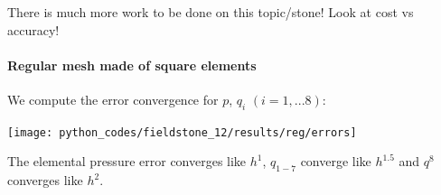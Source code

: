 There is much more work to be done on this topic/stone! Look at cost vs accuracy!

\newpage
\paragraph{Regular mesh made of square elements}

We compute the error convergence for $p$, $q_i$ $(i=1,...8)$:
\begin{center}
\texttt{[image: python\_codes/fieldstone\_12/results/reg/errors]}
\end{center}
The elemental pressure error converges like $h^1$, $q_{1-7}$ converge like $h^{1.5}$ and 
$q^8$ converges like $h^2$.


